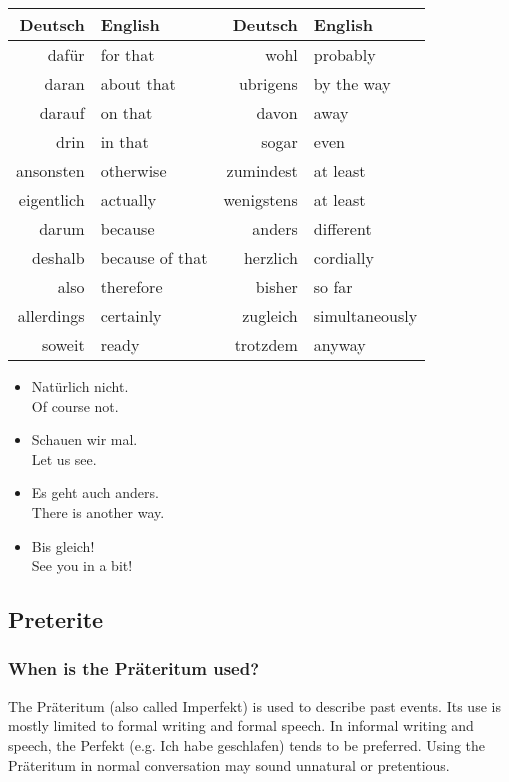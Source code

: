 \begin{center}\begin{tabular}{r|l||r|l}
  \textbf{Deutsch} & \textbf{English} & \textbf{Deutsch} & \textbf{English} \\
	\hline
	daf{\"u}r & for that & wohl & probably \\
	daran & about that & ubrigens & by the way \\
	darauf & on that & davon & away \\
	drin & in that & sogar & even \\
	ansonsten & otherwise & zumindest & at least \\
	eigentlich & actually & wenigstens & at least \\
	darum & because & anders & different \\
	deshalb & because of that & herzlich & cordially \\
	also & therefore & bisher & so far \\
	allerdings & certainly & zugleich & simultaneously \\
	soweit & ready & trotzdem & anyway \\	
\end{tabular}\end{center}

\begin{itemize}
  \item  Nat{\"u}rlich nicht. \\ Of course not.
  \item  Schauen wir mal. \\ Let us see.
  \item  Es geht auch anders. \\ There is another way.
  \item  Bis gleich! \\ See you in a bit!
\end{itemize}


\pagebreak
\subsection{Preterite}

\subsubsection{When is the Pr{\"a}teritum used?}

The Pr{\"a}teritum (also called Imperfekt) is used to describe past events. Its use is mostly limited to formal writing and formal speech. In informal writing and speech, the Perfekt (e.g. Ich habe geschlafen) tends to be preferred. Using the Pr{\"a}teritum in normal conversation may sound unnatural or pretentious.

